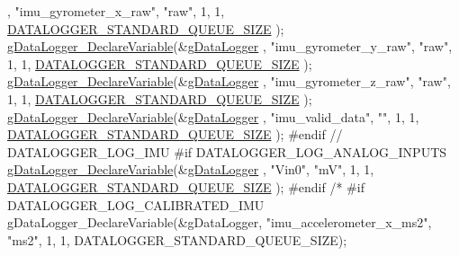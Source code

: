\begin{DoxyCode}
{      , \textcolor{stringliteral}{"imu\_gyrometer\_x\_raw"}, \textcolor{stringliteral}{"raw"}, 1, 1, \hyperlink{datalogger_01_07Caio-PC's_01conflicted_01copy_012012-11-23_08_8h_ac244ccff7e47d7f9e79c1b606664f4fa}{DATALOGGER\_STANDARD\_QUEUE\_SIZE}
      );
        \hyperlink{gdatalogger_8c_a3f8f2b3c3f5edc72c3a1887965a544c1}{gDataLogger\_DeclareVariable}(&\hyperlink{datalogger_01_07Caio-PC's_01conflicted_01copy_012012-11-23_08_8c_abe3b9c2c4e21e79c7b046b5986d13acc}{gDataLogger}
      , \textcolor{stringliteral}{"imu\_gyrometer\_y\_raw"}, \textcolor{stringliteral}{"raw"}, 1, 1, \hyperlink{datalogger_01_07Caio-PC's_01conflicted_01copy_012012-11-23_08_8h_ac244ccff7e47d7f9e79c1b606664f4fa}{DATALOGGER\_STANDARD\_QUEUE\_SIZE}
      );
        \hyperlink{gdatalogger_8c_a3f8f2b3c3f5edc72c3a1887965a544c1}{gDataLogger\_DeclareVariable}(&\hyperlink{datalogger_01_07Caio-PC's_01conflicted_01copy_012012-11-23_08_8c_abe3b9c2c4e21e79c7b046b5986d13acc}{gDataLogger}
      , \textcolor{stringliteral}{"imu\_gyrometer\_z\_raw"}, \textcolor{stringliteral}{"raw"}, 1, 1, \hyperlink{datalogger_01_07Caio-PC's_01conflicted_01copy_012012-11-23_08_8h_ac244ccff7e47d7f9e79c1b606664f4fa}{DATALOGGER\_STANDARD\_QUEUE\_SIZE}
      );
    \hyperlink{gdatalogger_8c_a3f8f2b3c3f5edc72c3a1887965a544c1}{gDataLogger\_DeclareVariable}(&\hyperlink{datalogger_01_07Caio-PC's_01conflicted_01copy_012012-11-23_08_8c_abe3b9c2c4e21e79c7b046b5986d13acc}{gDataLogger}
      , \textcolor{stringliteral}{"imu\_valid\_data"}, \textcolor{stringliteral}{""}, 1, 1, \hyperlink{datalogger_01_07Caio-PC's_01conflicted_01copy_012012-11-23_08_8h_ac244ccff7e47d7f9e79c1b606664f4fa}{DATALOGGER\_STANDARD\_QUEUE\_SIZE}
      );
\textcolor{preprocessor}{        #endif // DATALOGGER\_LOG\_IMU}
\textcolor{preprocessor}{}        
\textcolor{preprocessor}{    #if DATALOGGER\_LOG\_ANALOG\_INPUTS}
\textcolor{preprocessor}{}    \hyperlink{gdatalogger_8c_a3f8f2b3c3f5edc72c3a1887965a544c1}{gDataLogger\_DeclareVariable}(&\hyperlink{datalogger_01_07Caio-PC's_01conflicted_01copy_012012-11-23_08_8c_abe3b9c2c4e21e79c7b046b5986d13acc}{gDataLogger}
      , \textcolor{stringliteral}{"Vin0"}, \textcolor{stringliteral}{"mV"}, 1, 1, \hyperlink{datalogger_01_07Caio-PC's_01conflicted_01copy_012012-11-23_08_8h_ac244ccff7e47d7f9e79c1b606664f4fa}{DATALOGGER\_STANDARD\_QUEUE\_SIZE}
      );
\textcolor{preprocessor}{    #endif}
\textcolor{preprocessor}{}\textcolor{comment}{/*}
\textcolor{comment}{    #if DATALOGGER\_LOG\_CALIBRATED\_IMU}
\textcolor{comment}{    gDataLogger\_DeclareVariable(&gDataLogger, "imu\_accelerometer\_x\_ms2", "ms2",
       1, 1, DATALOGGER\_STANDARD\_QUEUE\_SIZE);}
}
\end{DoxyCode}

